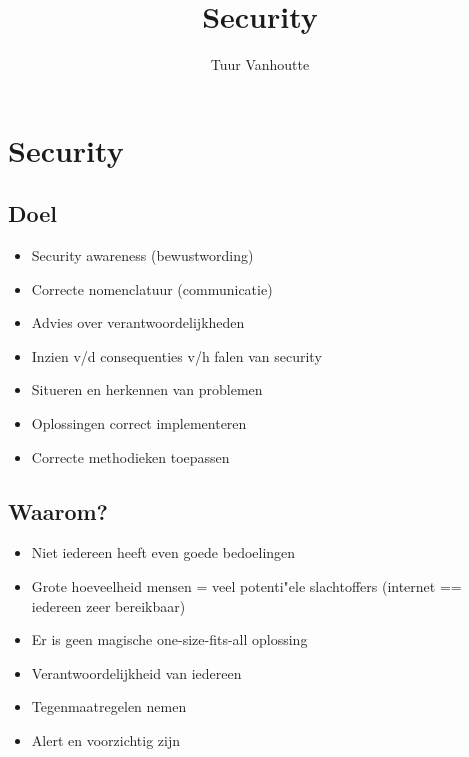 \documentclass{article}
\begin{document}
\begin{titlepage}
    \author{Tuur Vanhoutte}
    \title{Security}
\end{titlepage}

\maketitle
\newpage
\tableofcontents
\newpage


\section{Security}

\subsection{Doel}
\begin{itemize}
    \item Security awareness  (bewustwording)
    \item Correcte nomenclatuur (communicatie)
    \item Advies over verantwoordelijkheden
    \item Inzien v/d consequenties v/h falen van security
    \item Situeren en herkennen van problemen
    \item Oplossingen correct implementeren
    \item Correcte methodieken toepassen
\end{itemize}

\subsection{Waarom?}

\begin{itemize}
    \item Niet iedereen heeft even goede bedoelingen
    \item Grote hoeveelheid mensen = veel potenti"ele slachtoffers (internet == iedereen zeer bereikbaar)
    \item Er is geen magische one-size-fits-all oplossing
    \item Verantwoordelijkheid van iedereen
    \item Tegenmaatregelen nemen
    \item Alert en voorzichtig zijn
\end{itemize}
\end{document}
